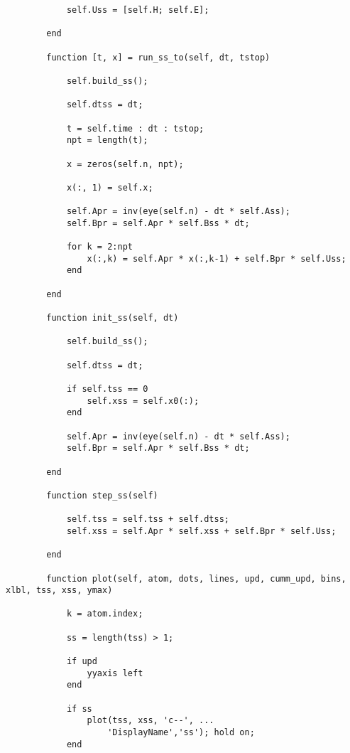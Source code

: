 \begin{lstlisting}
            self.Uss = [self.H; self.E];
          
        end
        
        function [t, x] = run_ss_to(self, dt, tstop)
            
            self.build_ss();
            
            self.dtss = dt;
            
            t = self.time : dt : tstop;
            npt = length(t);
            
            x = zeros(self.n, npt);
            
            x(:, 1) = self.x;
            
            self.Apr = inv(eye(self.n) - dt * self.Ass);
            self.Bpr = self.Apr * self.Bss * dt;
            
            for k = 2:npt     
                x(:,k) = self.Apr * x(:,k-1) + self.Bpr * self.Uss; 
            end
            
        end
        
        function init_ss(self, dt)
            
            self.build_ss();
            
            self.dtss = dt;
            
            if self.tss == 0
                self.xss = self.x0(:);
            end
            
            self.Apr = inv(eye(self.n) - dt * self.Ass);
            self.Bpr = self.Apr * self.Bss * dt;
            
        end
        
        function step_ss(self)
            
            self.tss = self.tss + self.dtss;
            self.xss = self.Apr * self.xss + self.Bpr * self.Uss;
            
        end
        
        function plot(self, atom, dots, lines, upd, cumm_upd, bins, xlbl, tss, xss, ymax)
            
            k = atom.index;
            
            ss = length(tss) > 1;
            
            if upd
                yyaxis left
            end
            
            if ss
                plot(tss, xss, 'c--', ...
                    'DisplayName','ss'); hold on;
            end
            

\end{lstlisting}
